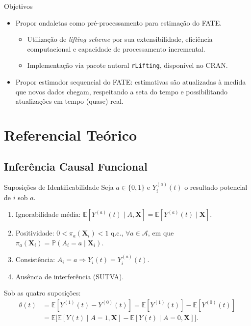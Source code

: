 \documentclass{beamer}
\begin{document}
\begin{frame}{Objetivos}
\begin{itemize}
    \item Propor ondaletas como pré-processamento para estimação do FATE.
    \begin{itemize}
        \item Utilização de \textit{lifting scheme} por sua extensibilidade, eficiência computacional e capacidade de processamento incremental.
        \item Implementação via pacote autoral \texttt{rLifting}, disponível no CRAN.
    \end{itemize}
    \medskip
    \item Propor estimador sequencial do FATE: estimativas são atualizadas à medida que novos dados chegam, respeitando a seta do tempo e possibilitando atualizações em tempo (quase) real.
\end{itemize}
\end{frame}

\section{Referencial Teórico}

\subsection{Inferência Causal Funcional}

\begin{frame}{Suposições de Identificabilidade}
\vspace{0.4cm}
Seja \(a \in \{0,1\}\) e \(Y_i^{(a)}(t)\) o resultado potencial de \(i\) sob \(a\).
\begin{enumerate}
    \item Ignorabilidade média: \(\mathbb{E}[Y^{(a)}(t) \mid A, \mathbf{X}] = \mathbb{E}[Y^{(a)}(t) \mid \mathbf{X}]\).
    \item Positividade: \(0 < \pi_a(\mathbf{X}_i) < 1\) q.c., \(\forall a \in \mathcal{A}\), em que \(\pi_a(\mathbf{X}_i) = \mathbb{P}(A_i = a \mid \mathbf{X}_i)\).
    \item Consistência: \(A_i = a \Rightarrow Y_i(t) = Y_i^{(a)}(t)\).
    \item Ausência de interferência (SUTVA).
\end{enumerate}
\medskip
Sob as quatro suposições:
\begin{align*}
    \theta(t)
    &= \mathbb{E}[Y^{(1)}(t) - Y^{(0)}(t)] = \mathbb{E}\!\left[Y^{(1)}(t)\right] - \mathbb{E}\!\left[Y^{(0)}(t)\right] \\
    &= \mathbb{E}\!\Big[\mathbb{E}[Y(t)\mid A{=}1,\mathbf{X}] - \mathbb{E}[Y(t)\mid A{=}0,\mathbf{X}]\Big].
\end{align*}
\end{frame}
\end{document}
